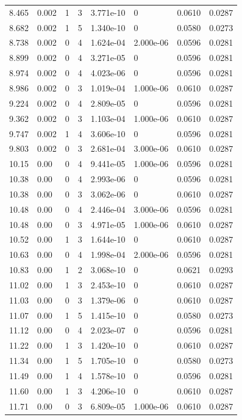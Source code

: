\documentclass[preview]{standalone}
\begin{document}
{{{\begin{tabular}{L{1.2cm}C{1.2cm} C{0.3cm}C{0.5cm} C{1.4cm}C{1.4cm} C{1.4cm}C{1.4cm}}
  8.465  &  0.002  & 1     &  3 &  3.771e-10  & 0  & 0.0610 &  0.0287   \\ 
  8.682  &  0.002  & 1     &  5 &  1.340e-10  & 0  & 0.0580 &  0.0273   \\ 
  8.738  &  0.002  & 0     &  4 &  1.624e-04  & 2.000e-06  & 0.0596 &  0.0281   \\ 
  8.899  &  0.002  & 0     &  4 &  3.271e-05  & 0  & 0.0596 &  0.0281   \\ 
  8.974  &  0.002  & 0     &  4 &  4.023e-06  & 0  & 0.0596 &  0.0281   \\ 
  8.986  &  0.002  & 0     &  3 &  1.019e-04  & 1.000e-06  & 0.0610 &  0.0287   \\ 
  9.224  &  0.002  & 0     &  4 &  2.809e-05  & 0  & 0.0596 &  0.0281   \\ 
  9.362  &  0.002  & 0     &  3 &  1.103e-04  & 1.000e-06  & 0.0610 &  0.0287   \\ 
  9.747  &  0.002  & 1     &  4 &  3.606e-10  & 0  & 0.0596 &  0.0281   \\ 
  9.803  &  0.002  & 0     &  3 &  2.681e-04  & 3.000e-06  & 0.0610 &  0.0287   \\ 
  10.15  &  0.00  & 0     &  4 &  9.441e-05  & 1.000e-06  & 0.0596 &  0.0281   \\ 
  10.38  &  0.00  & 0     &  4 &  2.993e-06  & 0  & 0.0596 &  0.0281   \\ 
  10.38  &  0.00  & 0     &  3 &  3.062e-06  & 0  & 0.0610 &  0.0287   \\ 
  10.48  &  0.00  & 0     &  4 &  2.446e-04  & 3.000e-06  & 0.0596 &  0.0281   \\ 
  10.48  &  0.00  & 0     &  3 &  4.971e-05  & 1.000e-06  & 0.0610 &  0.0287   \\ 
  10.52  &  0.00  & 1     &  3 &  1.644e-10  & 0  & 0.0610 &  0.0287   \\ 
  10.63  &  0.00  & 0     &  4 &  1.998e-04  & 2.000e-06  & 0.0596 &  0.0281   \\ 
  10.83  &  0.00  & 1     &  2 &  3.068e-10  & 0  & 0.0621 &  0.0293   \\ 
  11.02  &  0.00  & 1     &  3 &  2.453e-10  & 0  & 0.0610 &  0.0287   \\ 
  11.03  &  0.00  & 0     &  3 &  1.379e-06  & 0  & 0.0610 &  0.0287   \\ 
  11.07  &  0.00  & 1     &  5 &  1.415e-10  & 0  & 0.0580 &  0.0273   \\ 
  11.12  &  0.00  & 0     &  4 &  2.023e-07  & 0  & 0.0596 &  0.0281   \\ 
  11.22  &  0.00  & 1     &  3 &  1.420e-10  & 0  & 0.0610 &  0.0287   \\ 
  11.34  &  0.00  & 1     &  5 &  1.705e-10  & 0  & 0.0580 &  0.0273   \\ 
  11.49  &  0.00  & 1     &  4 &  1.578e-10  & 0  & 0.0596 &  0.0281   \\ 
  11.60  &  0.00  & 1     &  3 &  4.206e-10  & 0  & 0.0610 &  0.0287   \\ 
  11.71  &  0.00  & 0     &  3 &  6.809e-05  & 1.000e-06  & 0.0610 &  0.0287   \\ 
\hline 
\end{tabular} 

}}}
\end{document}
